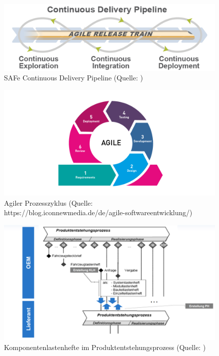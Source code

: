 \begin{figure}[htb]
	\centering
	\includegraphics[width=\textwidth]{img/ContinuousDeliveryPipeline.png}
	\caption[SAFe Continuous Delivery Pipeline (Quelle: \cite{SAFe})]{SAFe Continuous Delivery Pipeline (Quelle: \cite{SAFe})}
	\label{fig:SAFeCDP}
\end{figure}

\begin{figure}[htb]
	\centering
	\includegraphics[width=\textwidth]{img/agile_cycle.png}
	\caption[Agiler Prozesszyklus (Quelle: https://blog.iconnewmedia.de/de/agile-softwareentwicklung/)]{Agiler Prozesszyklus (Quelle: https://blog.iconnewmedia.de/de/agile-softwareentwicklung/)}
	\label{fig:agile2}
\end{figure}

\begin{figure}[htb]
	\centering
	\includegraphics[width=\textwidth]{img/klh_produktentstehungsprozess.png}
	\caption[Komponentenlastenhefte im Produktentstehungsprozess (Quelle: \cite{Daberkow2022})]{Komponentenlastenhefte im Produktentstehungsprozess (Quelle: \cite{Daberkow2022})}
	\label{fig:klh}
\end{figure}

